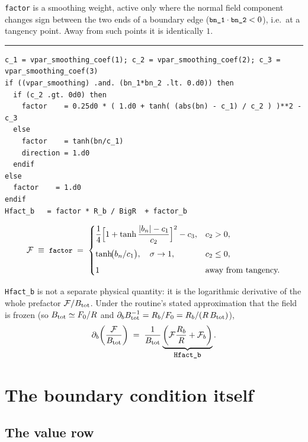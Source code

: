 \documentclass[11pt,a4paper]{article}
\newenvironment{codeline}[1]
  {\par\medskip\noindent\textcolor{coderule}{\rule{\linewidth}{0.4pt}}\par
   \nopagebreak\noindent{\ttfamily\footnotesize\textcolor{keyc}{#1}}\par\nopagebreak\smallskip}
  {\par\medskip}
\newcommand{\code}[1]{\texttt{\small #1}}
\begin{document}
\code{factor} is a smoothing weight, active only where the normal field component changes sign
between the two ends of a boundary edge ($\code{bn\_1}\cdot\code{bn\_2} < 0$), i.e.\ at a
tangency point.  Away from such points it is identically $1$.

\begin{codeline}{mod\_boundary\_conditions.f90:534--554}
\begin{lstlisting}
c_1 = vpar_smoothing_coef(1); c_2 = vpar_smoothing_coef(2); c_3 = vpar_smoothing_coef(3)
if ((vpar_smoothing) .and. (bn_1*bn_2 .lt. 0.d0)) then
  if (c_2 .gt. 0d0) then
    factor    = 0.25d0 * ( 1.d0 + tanh( (abs(bn) - c_1) / c_2 ) )**2 - c_3
  else
    factor    = tanh(bn/c_1)
    direction = 1.d0
  endif
else
  factor    = 1.d0
endif
Hfact_b   = factor * R_b / BigR  + factor_b
\end{lstlisting}
\end{codeline}

\begin{equation}
  \mathcal{F} \;\equiv\; \code{factor} \;=\;
  \begin{cases}
    \dfrac{1}{4}\Bigl[1 + \tanh\dfrac{|b_n| - c_1}{c_2}\Bigr]^{2} - c_3, & c_2 > 0,\\[2.2ex]
    \tanh\!\bigl(b_n/c_1\bigr), \quad \sigma \to 1, & c_2 \le 0,\\[1.2ex]
    1 & \text{away from tangency.}
  \end{cases}
  \label{eq:factor}
\end{equation}

\code{Hfact\_b} is not a separate physical quantity: it is the logarithmic derivative of the
whole prefactor $\mathcal{F}/B_{\rm tot}$.  Under the routine's stated approximation that the
field is frozen (so $B_{\rm tot}\simeq F_0/R$ and $\partial_b B_{\rm tot}^{-1} =
R_b/F_0 = R_b/(R\,B_{\rm tot})$),
\begin{equation}
  \partial_b\!\left(\frac{\mathcal{F}}{B_{\rm tot}}\right)
  \;=\; \frac{1}{B_{\rm tot}}\underbrace{\left(\mathcal{F}\frac{R_b}{R} + \mathcal{F}_b\right)}
        _{\textstyle \code{Hfact\_b}} .
  \label{eq:hfact}
\end{equation}

\section{The boundary condition itself}

\subsection{The value row}
\end{document}
